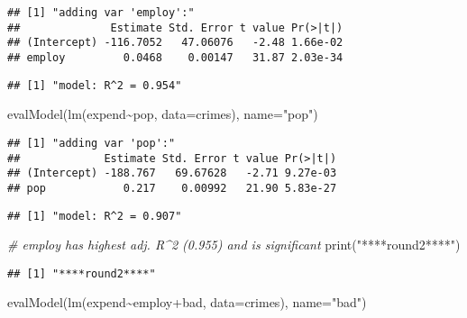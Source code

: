 \documentclass[
  11pt,
]{article}
\newenvironment{Shaded}{\begin{snugshade}}{\end{snugshade}}
\newcommand{\AttributeTok}[1]{\textcolor[rgb]{0.77,0.63,0.00}{#1}}
\newcommand{\CommentTok}[1]{\textcolor[rgb]{0.56,0.35,0.01}{\textit{#1}}}
\newcommand{\FunctionTok}[1]{\textcolor[rgb]{0.00,0.00,0.00}{#1}}
\newcommand{\NormalTok}[1]{#1}
\newcommand{\SpecialCharTok}[1]{\textcolor[rgb]{0.00,0.00,0.00}{#1}}
\newcommand{\StringTok}[1]{\textcolor[rgb]{0.31,0.60,0.02}{#1}}
\begin{document}
\begin{verbatim}
## [1] "adding var 'employ':"
##              Estimate Std. Error t value Pr(>|t|)
## (Intercept) -116.7052   47.06076   -2.48 1.66e-02
## employ         0.0468    0.00147   31.87 2.03e-34
\end{verbatim}

\begin{verbatim}
## [1] "model: R^2 = 0.954"
\end{verbatim}

\begin{Shaded}
\begin{Highlighting}[]
\FunctionTok{evalModel}\NormalTok{(}\FunctionTok{lm}\NormalTok{(expend}\SpecialCharTok{\textasciitilde{}}\NormalTok{pop, }\AttributeTok{data=}\NormalTok{crimes), }\AttributeTok{name=}\StringTok{"pop"}\NormalTok{)}
\end{Highlighting}
\end{Shaded}

\begin{verbatim}
## [1] "adding var 'pop':"
##             Estimate Std. Error t value Pr(>|t|)
## (Intercept) -188.767   69.67628   -2.71 9.27e-03
## pop            0.217    0.00992   21.90 5.83e-27
\end{verbatim}

\begin{verbatim}
## [1] "model: R^2 = 0.907"
\end{verbatim}

\begin{Shaded}
\begin{Highlighting}[]
\CommentTok{\# employ has highest adj. R\^{}2 (0.955) and is significant}
\FunctionTok{print}\NormalTok{(}\StringTok{"****round2****"}\NormalTok{)}
\end{Highlighting}
\end{Shaded}

\begin{verbatim}
## [1] "****round2****"
\end{verbatim}

\begin{Shaded}
\begin{Highlighting}[]
\FunctionTok{evalModel}\NormalTok{(}\FunctionTok{lm}\NormalTok{(expend}\SpecialCharTok{\textasciitilde{}}\NormalTok{employ}\SpecialCharTok{+}\NormalTok{bad, }\AttributeTok{data=}\NormalTok{crimes), }\AttributeTok{name=}\StringTok{"bad"}\NormalTok{)}
\end{Highlighting}
\end{Shaded}
\end{document}
